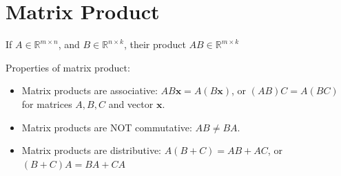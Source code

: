 \documentclass[conference,final,11pt,technote,onecolumn]{IEEEtran}\usepackage[]{graphicx}\usepackage[]{color}
\begin{document}
	\section{Matrix Product}
	\label{term:matrix_product}
If $A\in \mathbb{R}^{m\times n}$, and $B\in \mathbb{R}^{n\times k}$, their product $AB\in \mathbb{R}^{m\times k}$

Properties of matrix product:
\begin{itemize}
\item Matrix products are associative: $AB\mathbf{x} = A(B\mathbf{x})$, or $(AB)C = A(BC)$ for matrices $A,B,C$ and vector $\mathbf{x}$.
\item Matrix products are NOT commutative: $AB \neq BA$.
\item Matrix products are distributive: $A(B+C) = AB + AC$, or $(B+C)A = BA + CA$
\end{itemize}
\end{document}
